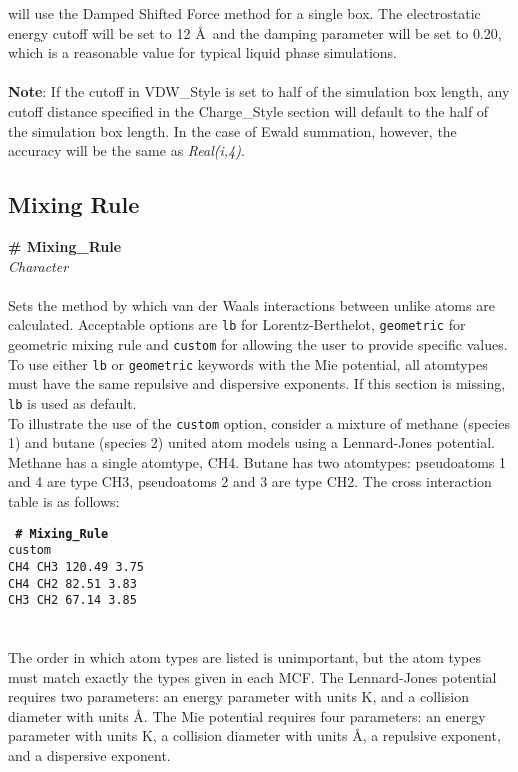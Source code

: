 will use the Damped Shifted Force method for a single box. The electrostatic
energy cutoff will be set to 12 \AA\ and the damping parameter will be set
to 0.20, which is a reasonable value for
typical liquid phase simulations. \\  \\
%
{\bf{Note}}: If the cutoff in VDW\_Style is set to half of the
simulation box length, any cutoff distance specified in the
Charge\_Style section will default to the half of the simulation box
length. In the case of Ewald summation, however, the accuracy will be
the same as {\it Real(i,4)}. 
%
%
%
\subsection{Mixing Rule}\label{Mixing_Rule}
{\bf \# Mixing\_Rule} \\
{\it Character} \\ \\
%
Sets the method by which van der Waals interactions between unlike atoms are calculated. 
Acceptable options are \texttt{lb} for Lorentz-Berthelot,
\texttt{geometric} for geometric mixing rule 
and \texttt{custom} for allowing the user to provide specific values. 
To use either \texttt{lb} or \texttt{geometric} keywords with the Mie potential, 
all atomtypes must have the same repulsive and dispersive exponents.
If this section is missing, \texttt{lb} is used as default. \\

To illustrate the use of the \texttt{custom} option, consider a mixture of methane (species 1) 
and butane (species 2) united atom models using a Lennard-Jones potential. 
Methane has a single atomtype, CH4. 
Butane has two atomtypes: pseudoatoms 1 and 4 are type CH3, pseudoatoms 2 and 3 are type CH2.
The cross interaction table is as follows:

\texttt{
{\bf \# Mixing\_Rule} \\
custom\\
CH4  CH3  120.49   3.75\\
CH4  CH2   82.51   3.83\\
CH3  CH2   67.14   3.85\\
}
\\ \\
The order in which atom types are listed is unimportant, 
but the atom types must match exactly the types given in each MCF.
The Lennard-Jones potential requires two parameters: 
an energy parameter with units K, and a collision diameter with units \AA.
The Mie potential requires four parameters: 
an energy parameter with units K, a collision diameter with units \AA,
a repulsive exponent, and a dispersive exponent.

